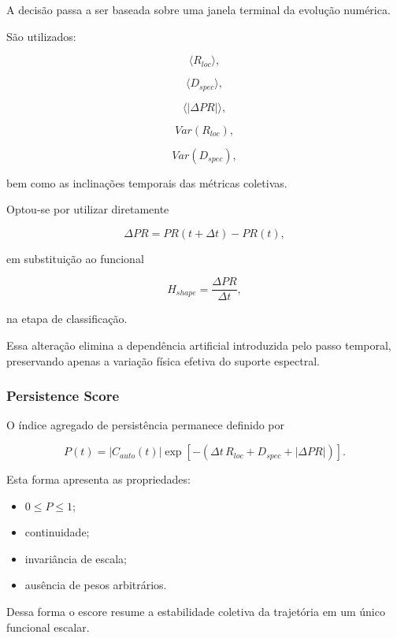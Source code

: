 \documentclass[11pt,a4paper]{article}
\begin{document}
A decisão passa a ser baseada sobre uma janela terminal da evolução
numérica.

São utilizados:

\[
\langle R_{loc}\rangle,
\]

\[
\langle D_{spec}\rangle,
\]

\[
\langle |\Delta PR| \rangle,
\]

\[
Var(R_{loc}),
\]

\[
Var(D_{spec}),
\]

bem como as inclinações temporais das métricas coletivas.

Optou-se por utilizar diretamente

\[
\Delta PR
=
PR(t+\Delta t)-PR(t),
\]

em substituição ao funcional

\[
H_{shape}
=
\frac{\Delta PR}{\Delta t},
\]

na etapa de classificação.

Essa alteração elimina a dependência artificial introduzida pelo passo
temporal, preservando apenas a variação física efetiva do suporte
espectral.


\subsubsection{Persistence Score}

O índice agregado de persistência permanece definido por

\[
P(t)
=
|C_{auto}(t)|
\exp
\left[
-
\left(
\Delta t\,R_{loc}
+
D_{spec}
+
|\Delta PR|
\right)
\right].
\]

Esta forma apresenta as propriedades:

\begin{itemize}

\item
\(0\le P\le1\);

\item
continuidade;

\item
invariância de escala;

\item
ausência de pesos arbitrários.

\end{itemize}

Dessa forma o escore resume a estabilidade coletiva da trajetória em um
único funcional escalar.
\end{document}
